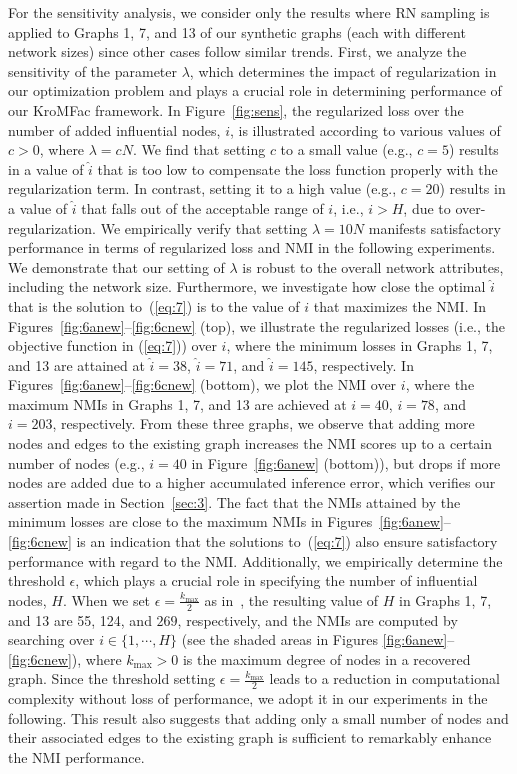 \documentclass[format=acmsmall, review=false, screen=true]{acmart}
\begin{document}
For the sensitivity analysis, we consider only the results where RN sampling is applied to Graphs 1, 7, and 13 of our synthetic graphs (each with different network sizes) since other cases follow similar trends.
First, we analyze the sensitivity of the parameter $\lambda$, which determines the impact of regularization in our optimization problem and plays a crucial role in determining performance of our \textsf{KroMFac} framework.  In Figure~\ref{fig:sens}, the regularized loss over the number of added influential nodes, $i$, is illustrated according to various values of $c>0$, where $\lambda=cN$. We find that setting $c$ to a small value (e.g., $c=5$) results in a value of $\hat{i}$ that is too low to compensate the loss function properly with the regularization term. In contrast, setting it to a high value (e.g., $c=20$) results in a value of $\hat{i}$ that falls out of the acceptable range of $i$,  i.e., $i > H$, due to over-regularization. We empirically verify that setting $\lambda = 10N$ manifests satisfactory performance in terms of regularized loss and NMI in the following experiments. We demonstrate that our setting of $\lambda$ is robust to the overall network attributes, including the network size. Furthermore, we investigate how close the optimal $\hat{i}$ that is the solution to~(\ref{eq:7}) is to the value of $i$ that maximizes the NMI. In Figures~\ref{fig:6anew}--\ref{fig:6cnew} (top), we illustrate the regularized losses (i.e., the objective function in (\ref{eq:7})) over $i$, where the minimum losses in Graphs 1, 7, and 13 are attained at $\hat{i}=38$, $\hat{i}=71$, and $\hat{i}=145$, respectively. In Figures~\ref{fig:6anew}--\ref{fig:6cnew} (bottom), we plot the NMI over $i$, where the maximum NMIs in Graphs 1, 7, and 13 are achieved at $i=40$, $i=78$, and  $i=203$, respectively. From these three graphs, we observe that adding more nodes and edges to the existing graph increases the NMI scores up to a certain number of nodes (e.g., $i=40$ in Figure~\ref{fig:6anew} (bottom)), but drops if more nodes are added due to a higher accumulated inference error, which verifies our assertion made in Section~\ref{sec:3}. The fact that the NMIs attained by the minimum losses are close to the maximum NMIs in Figures~\ref{fig:6anew}--\ref{fig:6cnew} is an indication that the solutions to~(\ref{eq:7}) also ensure satisfactory performance with regard to the NMI. Additionally, we empirically determine the threshold $\epsilon$, which plays a crucial role in specifying the number of influential nodes, $H$. When we set $\epsilon=\frac{k_{\max}}{2}$ as in~\cite{yuan2010fish}, the resulting value of $H$ in Graphs 1, 7, and 13 are 55,  124, and $269$, respectively, and the NMIs are computed by searching over $i\in\{1,\cdots,H\}$ (see the shaded areas in Figures \ref{fig:6anew}--\ref{fig:6cnew}), where $k_{\max}>0$ is the maximum degree of nodes in a recovered graph. 
 Since the threshold setting $\epsilon=\frac{k_{\max}}{2}$ leads to a reduction in computational complexity without loss of performance, we adopt it in our experiments in the following. This result also suggests that adding only a small number of nodes and their associated edges to the existing graph is sufficient to remarkably enhance the NMI performance.
\end{document}
